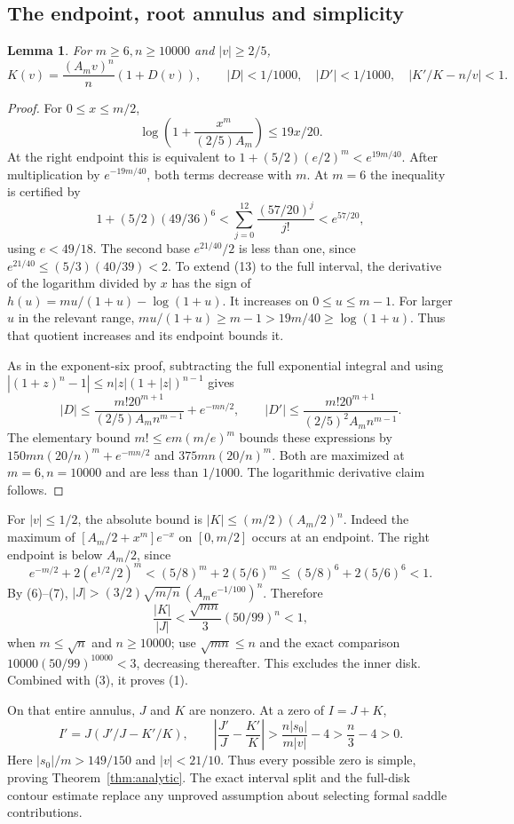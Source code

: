 \documentclass[11pt]{article}
\newtheorem{lemma}[theorem]{Lemma}
\begin{document}
\subsection{The endpoint, root annulus and simplicity}
\begin{lemma}\label{lem:K}
For $m\ge6,n\ge10000$ and $|v|\ge2/5$,
\[
 K(v)=\frac{(A_mv)^n}{n}(1+D(v)),\qquad
 |D|<1/1000,\quad |D'|<1/1000,\quad
 \left|K'/K-n/v\right|<1.                            \tag{12}
\]
\end{lemma}
\begin{proof}
For $0\le x\le m/2$,
\[
 \log\left(1+\frac{x^m}{(2/5)A_m}\right)\le19x/20.     \tag{13}
\]
At the right endpoint this is equivalent to
$1+(5/2)(e/2)^m<e^{19m/40}$.
After multiplication by $e^{-19m/40}$, both terms decrease with $m$.
At $m=6$ the inequality is certified by
\[
 1+(5/2)(49/36)^6<\sum_{j=0}^{12}\frac{(57/20)^j}{j!}<e^{57/20},
\]
using $e<49/18$.
The second base $e^{21/40}/2$ is less than one, since
$e^{21/40}\le(5/3)(40/39)<2$.
To extend (13) to the full interval, the derivative of the logarithm
divided by $x$ has the sign of
$h(u)=mu/(1+u)-\log(1+u)$.
It increases on $0\le u\le m-1$. For larger $u$ in the relevant range,
$mu/(1+u)\ge m-1>19m/40\ge\log(1+u)$.
Thus that quotient increases and its endpoint bounds it.

As in the exponent-six proof, subtracting the full exponential integral
and using $|(1+z)^n-1|\le n|z|(1+|z|)^{n-1}$ gives
\[
 |D|\le\frac{m!20^{m+1}}{(2/5)A_m n^{m-1}}+e^{-mn/2},\qquad
 |D'|\le\frac{m!20^{m+1}}{(2/5)^2A_m n^{m-1}}.
\]
The elementary bound $m!\le em(m/e)^m$ bounds these expressions by
$150mn(20/n)^m+e^{-mn/2}$ and $375mn(20/n)^m$.
Both are maximized at $m=6,n=10000$ and are less than $1/1000$.
The logarithmic derivative claim follows.
\end{proof}

For $|v|\le1/2$, the absolute bound is
$|K|\le(m/2)(A_m/2)^n$. Indeed the maximum of
$[A_m/2+x^m]e^{-x}$ on $[0,m/2]$ occurs at an endpoint.
The right endpoint is below $A_m/2$, since
\[
 e^{-m/2}+2(e^{1/2}/2)^m
 <(5/8)^m+2(5/6)^m\le(5/8)^6+2(5/6)^6<1.
\]
By (6)--(7), $|J|>(3/2)\sqrt{m/n}\,(A_me^{-1/100})^n$.
Therefore
\[
 \frac{|K|}{|J|}<\frac{\sqrt{mn}}3(50/99)^n<1,
\]
when $m\le\sqrt n$ and $n\ge10000$; use $\sqrt{mn}\le n$ and the
exact comparison $10000(50/99)^{10000}<3$, decreasing thereafter.
This excludes the inner disk. Combined with (3), it proves (1).

On that entire annulus, $J$ and $K$ are nonzero. At a zero of $I=J+K$,
\[
 I'=J(J'/J-K'/K),\qquad
 \left|\frac{J'}J-\frac{K'}K\right|
 >\frac{n|s_0|}{m|v|}-4>\frac n3-4>0.                \tag{14}
\]
Here $|s_0|/m>149/150$ and $|v|<21/10$.
Thus every possible zero is simple, proving Theorem~\ref{thm:analytic}.
The exact interval split and the full-disk contour estimate replace any
unproved assumption about selecting formal saddle contributions.
\end{document}
